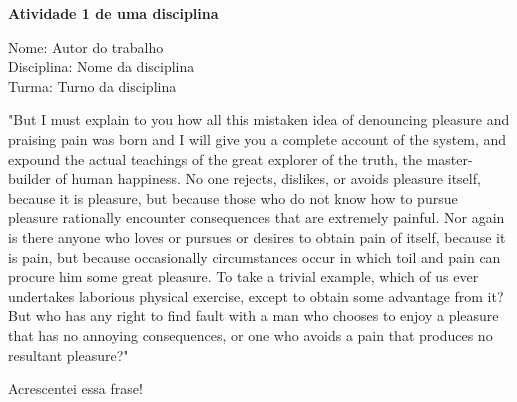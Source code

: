 \documentclass[12pt,a4paper]{article}
\begin{document}
\begin{center}
{\large\textbf{Atividade 1 de uma disciplina}}
\end{center}
\vspace{0.5cm}

\begin{flushleft}
Nome: Autor do trabalho \\
Disciplina: Nome da disciplina\\
Turma: Turno da disciplina
\end{flushleft}

\begin{landscape}
"But I must explain to you how all this mistaken idea of denouncing pleasure and praising pain was born and I will give you a complete account of the system, and expound the actual teachings of the great explorer of the truth, the master-builder of human happiness. No one rejects, dislikes, or avoids pleasure itself, because it is pleasure, but because those who do not know how to pursue pleasure rationally encounter consequences that are extremely painful. Nor again is there anyone who loves or pursues or desires to obtain pain of itself, because it is pain, but because occasionally circumstances occur in which toil and pain can procure him some great pleasure. To take a trivial example, which of us ever undertakes laborious physical exercise, except to obtain some advantage from it? But who has any right to find fault with a man who chooses to enjoy a pleasure that has no annoying consequences, or one who avoids a pain that produces no resultant pleasure?"

Acrescentei essa frase!

\end{landscape}
\end{document}
